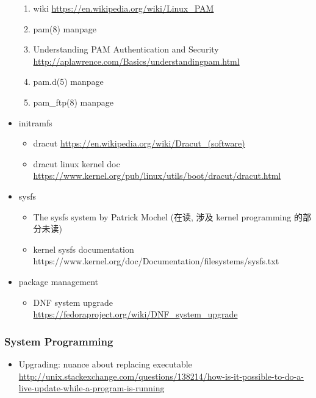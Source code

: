 \documentclass{article}
\begin{document}
\begin{itemize}
\begin{enumerate}
            \item wiki \url{https://en.wikipedia.org/wiki/Linux_PAM}
            \item pam(8) manpage
            \item Understanding PAM Authentication and Security \url{http://aplawrence.com/Basics/understandingpam.html}
            \item pam.d(5) manpage
            \item pam_ftp(8) manpage
        \end{enumerate}
    \item initramfs
        \begin{itemize}
            \item dracut \url{https://en.wikipedia.org/wiki/Dracut_(software)}
            \item dracut linux kernel doc \url{https://www.kernel.org/pub/linux/utils/boot/dracut/dracut.html}
        \end{itemize}
    \item sysfs
        \begin{itemize}
            \item The sysfs system by Patrick Mochel (在读, 涉及 kernel programming 的部分未读)
            \item kernel sysfs documentation https://www.kernel.org/doc/Documentation/filesystems/sysfs.txt
        \end{itemize}
    \item package management
        \begin{itemize}
            \item DNF system upgrade \url{https://fedoraproject.org/wiki/DNF_system_upgrade}
        \end{itemize}
\end{itemize}
%
\subsubsection{System Programming}
%
\begin{itemize}
    \item Upgrading: nuance about replacing executable \url{http://unix.stackexchange.com/questions/138214/how-is-it-possible-to-do-a-live-update-while-a-program-is-running}
\end{itemize}
%
\end{document}

